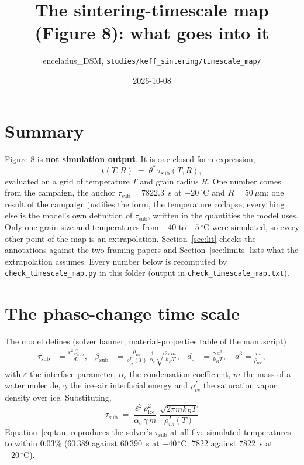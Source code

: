 \documentclass[11pt]{article}
\title{The sintering-timescale map (Figure 8): what goes into it}
\author{enceladus\_DSM, \texttt{studies/keff\_sintering/timescale\_map/}}
\date{2026-10-08}
\newcommand{\degC}{\,^{\circ}\mathrm{C}}
\newcommand{\taus}{\tau_{\mathrm{sub}}}
\newcommand{\rvs}{\rho_{vs}^{I}}
\begin{document}
\maketitle

\section*{Summary}

Figure 8 is \textbf{not simulation output}. It is one closed-form expression,
\begin{equation}
  t(T,R) \;=\; \theta^{*}\,\taus(T,R),
  \label{eq:map}
\end{equation}
evaluated on a grid of temperature $T$ and grain radius $R$. One number comes
from the campaign, the anchor $\taus = 7822.3$~s at $-20\degC$ and
$R = 50~\mu$m; one result of the campaign justifies the form, the temperature
collapse; everything else is the model's own definition of $\taus$, written
in the quantities the model uses. Only one grain size and temperatures from
$-40$ to $-5\degC$ were simulated, so every other point of the map is an
extrapolation. Section~\ref{sec:lit} checks the annotations against the two
framing papers and Section~\ref{sec:limits} lists what the extrapolation
assumes. Every number below is recomputed by \texttt{check\_timescale\_map.py}
in this folder (output in \texttt{check\_timescale\_map.txt}).

\section{The phase-change time scale}

The model defines (solver banner; material-properties table of the manuscript)
\begin{align}
  \taus &= \frac{\varepsilon^{2}\,\beta_{\mathrm{sub}}}{d_0}, &
  \beta_{\mathrm{sub}} &= \frac{\rho_{\mathrm{ice}}}{\rvs(T)}\,
      \frac{1}{\alpha_c}\sqrt{\frac{2\pi m}{k_B T}}, &
  d_0 &= \frac{\gamma\,a^{3}}{k_B T},\quad a^{3} = \frac{m}{\rho_{\mathrm{ice}}} ,
\end{align}
with $\varepsilon$ the interface parameter, $\alpha_c$ the condensation
coefficient, $m$ the mass of a water molecule, $\gamma$ the ice--air
interfacial energy and $\rvs$ the saturation vapor density over ice.
Substituting,
\begin{equation}
  \boxed{\;\taus \;=\; \frac{\varepsilon^{2}\,\rho_{\mathrm{ice}}^{2}}
        {\alpha_c\,\gamma\,m}\;\frac{\sqrt{2\pi m k_B T}}{\rvs(T)}\;}
  \label{eq:tau}
\end{equation}
Equation~\eqref{eq:tau} reproduces the solver's $\taus$ at all five simulated
temperatures to within 0.03\% (60\,389 against 60\,390~s at $-40\degC$; 7822
against 7822~s at $-20\degC$).
\end{document}
